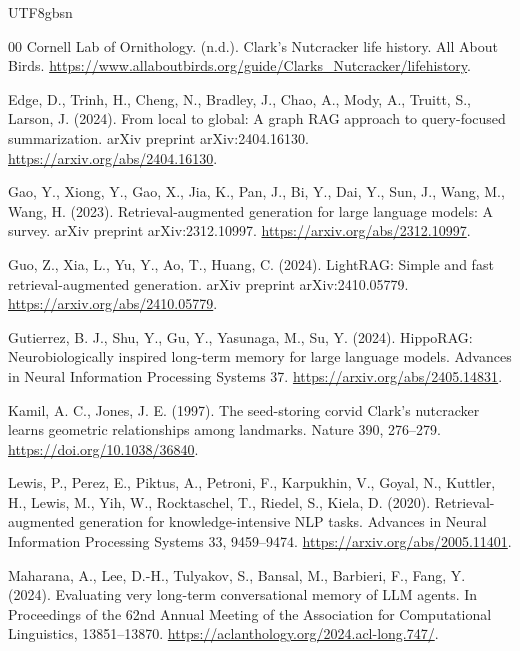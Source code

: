 \documentclass[a4paper,fleqn]{cas-sc}
\begin{document}
\begin{CJK*}{UTF8}{gbsn}
\begin{thebibliography}{00}
Cornell Lab of Ornithology. (n.d.). Clark's Nutcracker life history. All About Birds. \url{https://www.allaboutbirds.org/guide/Clarks_Nutcracker/lifehistory}.

Edge, D., Trinh, H., Cheng, N., Bradley, J., Chao, A., Mody, A., Truitt, S., Larson, J. (2024). From local to global: A graph RAG approach to query-focused summarization. arXiv preprint arXiv:2404.16130. \url{https://arxiv.org/abs/2404.16130}.

Gao, Y., Xiong, Y., Gao, X., Jia, K., Pan, J., Bi, Y., Dai, Y., Sun, J., Wang, M., Wang, H. (2023). Retrieval-augmented generation for large language models: A survey. arXiv preprint arXiv:2312.10997. \url{https://arxiv.org/abs/2312.10997}.

Guo, Z., Xia, L., Yu, Y., Ao, T., Huang, C. (2024). LightRAG: Simple and fast retrieval-augmented generation. arXiv preprint arXiv:2410.05779. \url{https://arxiv.org/abs/2410.05779}.

Gutierrez, B. J., Shu, Y., Gu, Y., Yasunaga, M., Su, Y. (2024). HippoRAG: Neurobiologically inspired long-term memory for large language models. Advances in Neural Information Processing Systems 37. \url{https://arxiv.org/abs/2405.14831}.

Kamil, A. C., Jones, J. E. (1997). The seed-storing corvid Clark's nutcracker learns geometric relationships among landmarks. Nature 390, 276--279. \url{https://doi.org/10.1038/36840}.

Lewis, P., Perez, E., Piktus, A., Petroni, F., Karpukhin, V., Goyal, N., Kuttler, H., Lewis, M., Yih, W., Rocktaschel, T., Riedel, S., Kiela, D. (2020). Retrieval-augmented generation for knowledge-intensive NLP tasks. Advances in Neural Information Processing Systems 33, 9459--9474. \url{https://arxiv.org/abs/2005.11401}.

Maharana, A., Lee, D.-H., Tulyakov, S., Bansal, M., Barbieri, F., Fang, Y. (2024). Evaluating very long-term conversational memory of LLM agents. In Proceedings of the 62nd Annual Meeting of the Association for Computational Linguistics, 13851--13870. \url{https://aclanthology.org/2024.acl-long.747/}.


\end{thebibliography}
\end{CJK*}
\end{document}
